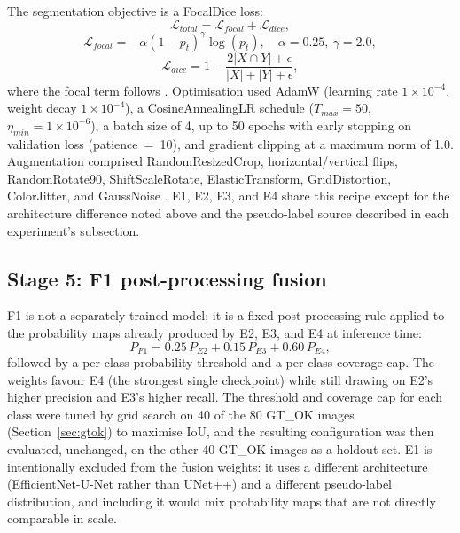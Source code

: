 \documentclass[final,5p,times,twocolumn,authoryear]{elsarticle}
\begin{document}
The segmentation objective is a FocalDice loss:
\begin{equation}
\mathcal{L}_{total} = \mathcal{L}_{focal} + \mathcal{L}_{dice},
\end{equation}
\begin{equation}
\mathcal{L}_{focal} = -\alpha(1-p_t)^\gamma \log(p_t), \quad \alpha=0.25,\ \gamma=2.0,
\end{equation}
\begin{equation}
\mathcal{L}_{dice} = 1 - \frac{2|X \cap Y| + \epsilon}{|X| + |Y| + \epsilon},
\end{equation}
where the focal term follows \citet{lin2017focal}. Optimisation used AdamW \citep{loshchilov2019decoupled} (learning rate $1\times10^{-4}$, weight decay $1\times10^{-4}$), a CosineAnnealingLR schedule ($T_{max}=50$, $\eta_{min}=1\times10^{-6}$), a batch size of 4, up to 50 epochs with early stopping on validation loss (patience~=~10), and gradient clipping at a maximum norm of 1.0. Augmentation comprised RandomResizedCrop, horizontal/vertical flips, RandomRotate90, ShiftScaleRotate, ElasticTransform, GridDistortion, ColorJitter, and GaussNoise \citep{buslaev2020albumentations}. E1, E2, E3, and E4 share this recipe except for the architecture difference noted above and the pseudo-label source described in each experiment's subsection.

\subsection{Stage 5: F1 post-processing fusion}
\label{sec:fusion}

F1 is not a separately trained model; it is a fixed post-processing rule applied to the probability maps already produced by E2, E3, and E4 at inference time:
\begin{equation}
P_{F1} = 0.25\,P_{E2} + 0.15\,P_{E3} + 0.60\,P_{E4},
\end{equation}
followed by a per-class probability threshold and a per-class coverage cap. The weights favour E4 (the strongest single checkpoint) while still drawing on E2's higher precision and E3's higher recall. The threshold and coverage cap for each class were tuned by grid search on 40 of the 80 GT\_OK images (Section~\ref{sec:gtok}) to maximise IoU, and the resulting configuration was then evaluated, unchanged, on the other 40 GT\_OK images as a holdout set. E1 is intentionally excluded from the fusion weights: it uses a different architecture (EfficientNet-U-Net rather than UNet++) and a different pseudo-label distribution, and including it would mix probability maps that are not directly comparable in scale.
\end{document}
